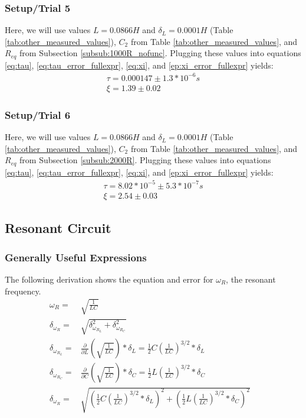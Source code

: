 \documentclass[12pt]{article}
\newcommand{\paren}[1]{\left( {#1} \right)}
\begin{document}
\subsubsection{Setup/Trial 5}
Here, we will use values $L=0.0866H$ and $\delta_L=0.0001H$ (Table \ref{tab:other_measured_values}), $C_2$ from Table \ref{tab:other_measured_values}, and $R_{eq}$ from Subsection \ref{subsub:1000R_nofunc}. Plugging these values into equations \ref{eq:tau}, \ref{eq:tau_error_fullexpr}, \ref{eq:xi}, and \ref{ep:xi_error_fullexpr} yields:
\begin{align}
	\tau=0.000147\pm1.3*10^{-6} s \label{num:tau_trial_five} \\
	\xi=1.39\pm0.02 \label{num:xi_trial_five}
\end{align}

\subsubsection{Setup/Trial 6}
Here, we will use values $L=0.0866H$ and $\delta_L=0.0001H$ (Table \ref{tab:other_measured_values}), $C_2$ from Table \ref{tab:other_measured_values}, and $R_{eq}$ from Subsection \ref{subsub:2000R}. Plugging these values into equations \ref{eq:tau}, \ref{eq:tau_error_fullexpr}, \ref{eq:xi}, and \ref{ep:xi_error_fullexpr} yields:
\begin{align}
	\tau=8.02*10^{-5}\pm5.3*10^{-7} s \label{num:tau_trial_six} \\
	\xi=2.54\pm0.03 \label{num:xi_trial_six}
\end{align}

\clearpage
\subsection{Resonant Circuit} \label{sec:Resonant_Circuit}
\subsubsection{Generally Useful Expressions}
The following derivation shows the equation and error for $\omega_R$, the resonant frequency.
\begin{align}
	\omega_R=&\sqrt{\frac{1}{LC}} \label{eq:omega_R} \\
	\delta_{\omega_R}=&\sqrt{\delta_{\omega_{R_{L}}}^2+\delta_{\omega_{R_{C}}}^2}  \label{eq:omega_R_error} \\
	\delta_{\omega_{R_{L}}}=&\frac{\partial}{\partial L}\paren{\sqrt{\frac{1}{LC}}}*\delta_L=\frac{1}{2}C\paren{\frac{1}{LC}}^{3/2}*\delta_L \nonumber \\
	\delta_{\omega_{R_{C}}}=&\frac{\partial}{\partial C}\paren{\sqrt{\frac{1}{LC}}}*\delta_C=\frac{1}{2}L\paren{\frac{1}{LC}}^{3/2}*\delta_C \nonumber \\
	\delta_{\omega_R}=&\sqrt{\paren{\frac{1}{2}C\paren{\frac{1}{LC}}^{3/2}*\delta_L}^2+\paren{\frac{1}{2}L\paren{\frac{1}{LC}}^{3/2}*\delta_C}^2}& \label{eq:omega_R_error_fullexpr}
\end{align}
\end{document}
